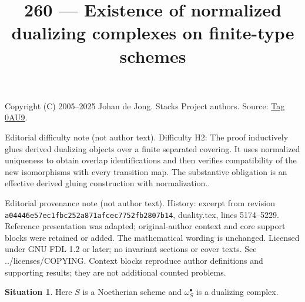 \documentclass{amsart}
\theoremstyle{plain}
\theoremstyle{definition}
\newtheorem{situation}[subsection]{Situation}
\theoremstyle{remark}
\numberwithin{equation}{subsection}
\begin{document}
\title[Stacks Project, Tag 0AU9]{260 --- Existence of normalized dualizing complexes on finite-type schemes}
\maketitle
\noindent Copyright (C) 2005--2025 Johan de Jong. Stacks Project authors. Source: \href{https://stacks.math.columbia.edu/tag/0AU9}{Tag 0AU9}.

\noindent Editorial difficulty note (not author text). Difficulty H2: The proof inductively glues derived dualizing objects over a finite separated covering. It uses normalized uniqueness to obtain overlap identifications and then verifies compatibility of the new isomorphisms with every transition map. The substantive obligation is an effective derived gluing construction with normalization..

\noindent Editorial provenance note (not author text). History: excerpt from revision \texttt{a0444\allowbreak 6e57e\allowbreak c1fbc\allowbreak 252a8\allowbreak 71afc\allowbreak ec775\allowbreak 2fb28\allowbreak 07b14}, duality.tex, lines 5174--5229. Reference presentation was adapted; original-author context and core support blocks were retained or added. The mathematical wording is unchanged. Licensed under GNU FDL 1.2 or later; no invariant sections or cover texts. See ../licenses/COPYING. Context blocks reproduce author definitions and supporting results; they are not additional counted problems.

\begin{situation}
\label{situation-dualizing}
Here $S$ is a Noetherian scheme and $\omega_S^\bullet$ is a dualizing
complex.
\end{situation}
\end{document}
